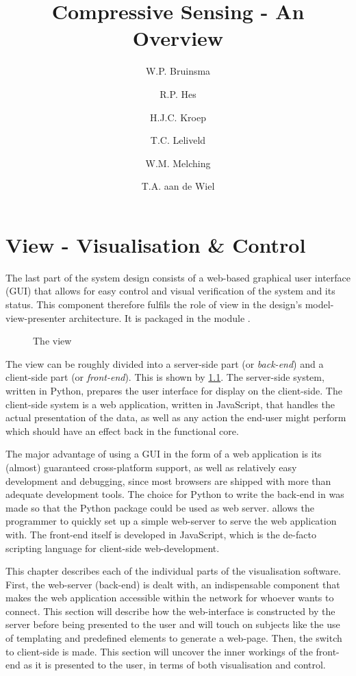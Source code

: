 \documentclass[a4paper, openany, oneside]{memoir}
\title{Compressive Sensing - An Overview}
\author{W.P. Bruinsma \and R.P. Hes \and H.J.C. Kroep \and T.C. Leliveld \and W.M. Melching \and T.A. aan de Wiel}
\begin{document}
\chapter{View - Visualisation \& Control}
\label{ch:visualisation}
The last part of the system design consists of a web-based graphical user interface (GUI) that allows for easy control and visual verification of the system and its status. This component therefore fulfils the role of view in the design's model-view-presenter architecture. It is packaged in the module .

\begin{figure}[h]
    \centering
    \begin{adjustbox}{width=0.7\textwidth}
    
    \end{adjustbox}
    \caption{The view}
    \label{fig:view-diagram}
\end{figure}

The view can be roughly divided into a server-side part (or \emph{back-end}) and a client-side part (or \emph{front-end}). This is shown by \cref{fig:view-diagram}. The server-side system, written in Python, prepares the user interface for display on the client-side. The client-side system is a web application, written in JavaScript, that handles the actual presentation of the data, as well as any action the end-user might perform which should have an effect back in the functional core.

The major advantage of using a GUI in the form of a web application is its (almost) guaranteed cross-platform support, as well as relatively easy development and debugging, since most browsers are shipped with more than adequate development tools.
The choice for Python to write the back-end in was made so that the  Python package could be used as web server.  allows the programmer to quickly set up a simple web-server to serve the web application with.
The front-end itself is developed in JavaScript, which is the de-facto scripting language for client-side web-development.

This chapter describes each of the individual parts of the visualisation software.
First, the web-server (back-end) is dealt with, an indispensable component that makes the web application accessible within the network for whoever wants to connect. This section will describe how the web-interface is constructed by the server before being presented to the user and will touch on subjects like the use of templating and predefined elements to generate a web-page.
Then, the switch to client-side is made. This section will uncover the inner workings of the front-end as it is presented to the user, in terms of both visualisation and control.
\end{document}
